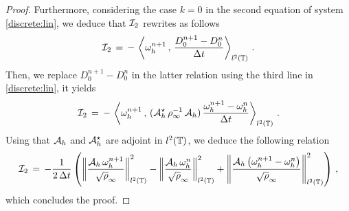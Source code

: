 \documentclass[11pt]{amsart}
\numberwithin{equation}{section}
\numberwithin{figure}{section}
\begin{document}
\begin{proof}
Furthermore, considering the case $k=0$ in the second equation of system \eqref{discrete:lin}, we deduce that ${\mathcal I}_2$ rewrites as follows
\[
{\mathcal I}_2 \,=\,-\, \left\langle
\omega_h^{n+1}  \,,\,\frac{D^{n+1}_{0} -D_{0}^{n} }{\Delta t} \right\rangle_{l^2\left({\mathbb T}\right)}\,.
\]
Then, we replace $D^{n+1}_{0} -D_{0}^{n}$ in the latter relation using the third line in \eqref{discrete:lin}, it yields
\[
{\mathcal I}_2 \,=\,-\, \left\langle
\omega_h^{n+1}  \,,\,({\mathcal A}_h^\star\,\rho_{\infty}^{-1}\,{\mathcal A}_h) \,\frac{\omega_h^{n+1} -\omega_h^{n} }{\Delta t} \right\rangle_{l^2\left({\mathbb T}\right)}\,.
\]
Using that ${\mathcal A}_h$ and ${\mathcal A}^\star_h$ are adjoint in $l^2({\mathbb T})$, we deduce the following relation
\[
{\mathcal I}_2 \,=\,-
\frac{1}{2\,\Delta t}
\left(
\left\|
\frac{{\mathcal A}_h \,\omega_h^{n+1}}{\sqrt{\rho}_{\infty}}
\right\|^2_{l^2\left({\mathbb T}\right)}
-\left\|
\frac{{\mathcal A}_h \,\omega_h^{n}}{\sqrt{\rho}_{\infty}}
\right\|^2_{l^2\left({\mathbb T}\right)}
+
\left\|
\frac{{\mathcal A}_h\left(\omega_h^{n+1}-\omega_h^{n}\right)}{\sqrt{\rho}_{\infty}}
\right\|^2_{l^2\left({\mathbb T}\right)}\right) \,,
\]
which concludes the proof.
\end{proof}
\end{document}
